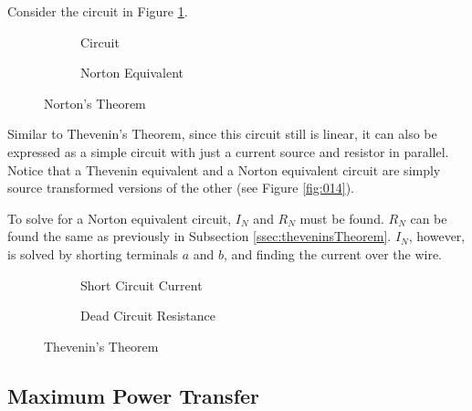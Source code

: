 \documentclass[12pt]{article}
\begin{document}
Consider the circuit in Figure \ref{fig:047}.
\begin{figure}[H]
  \centering
  \begin{subfigure}[H]{0.45\textwidth}
    \centering
    
    \caption{Circuit}
    \label{fig:047}
  \end{subfigure}
  \begin{subfigure}[H]{0.45\textwidth}
    \centering
    
    \caption{Norton Equivalent}
    \label{fig:048}
  \end{subfigure}
  \caption{Norton's Theorem}
  \label{fig:NortonTheoremOne}
  \vspace{-10pt}
\end{figure}
Similar to Thevenin's Theorem, since this circuit still is linear, it can also be expressed as a simple circuit with just a current source and resistor in parallel. Notice that a Thevenin equivalent and a Norton equivalent circuit are simply source transformed versions of the other (see Figure \ref{fig:014}).

To solve for a Norton equivalent circuit, $I_N$ and $R_N$ must be found. $R_N$ can be found the same as previously in Subsection \ref{ssec:theveninsTheorem}. $I_N$, however, is solved by shorting terminals $a$ and $b$, and finding the current over the wire.

\begin{figure}[H]
  \centering
  \begin{subfigure}[H]{0.45\textwidth}
    \centering
    
    \caption{Short Circuit Current}
    \label{fig:045}
  \end{subfigure}
  \begin{subfigure}[H]{0.45\textwidth}
    \centering
    
    \caption{Dead Circuit Resistance}
    \label{fig:046}
  \end{subfigure}
  \caption{Thevenin's Theorem}
  \label{fig:theveninsTheoremOne}
  \vspace{-10pt}
\end{figure}

\subsection{Maximum Power Transfer}
\label{ssec:maximumPowerTransfer}
\end{document}
